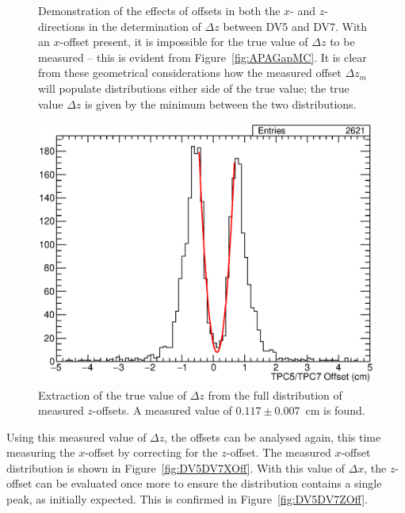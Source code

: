 \begin{figure}
\begin{subfigure}[t]{0.48\linewidth}
  \end{subfigure}
  \caption[Demonstration of the effects of offsets in both the $x$- and $z$-directions in the determination of $\Delta z$ between DV5 and DV7.]{Demonstration of the effects of offsets in both the $x$- and $z$-directions in the determination of $\Delta z$ between DV5 and DV7.  With an $x$-offset present, it is impossible for the true value of $\Delta z$ to be measured -- this is evident from Figure~\ref{fig:APAGapMC}.  It is clear from these geometrical considerations how the measured offset $\Delta z_m$ will populate distributions either side of the true value; the true value $\Delta z$ is given by the minimum between the two distributions.}
  \label{fig:APAGapXOffsetZOffset}
\end{figure}

\begin{figure}
  \centering
  \includegraphics[width=12cm]{TPC5TPC7GapFit.eps}
  \caption[Extraction of the true value of $\Delta z$ from the full distribution of measured $z$-offsets.]{Extraction of the true value of $\Delta z$ from the full distribution of measured $z$-offsets.  A measured value of $0.117\pm0.007$~cm is found.}
  \label{fig:DV5DV7GapFit}
\end{figure}

Using this measured value of $\Delta z$, the offsets can be analysed again, this time measuring the $x$-offset by correcting for the $z$-offset.  The measured $x$-offset distribution is shown in Figure~\ref{fig:DV5DV7XOff}.  With this value of $\Delta x$, the $z$-offset can be evaluated once more to ensure the distribution contains a single peak, as initially expected.  This is confirmed in Figure~\ref{fig:DV5DV7ZOff}.

